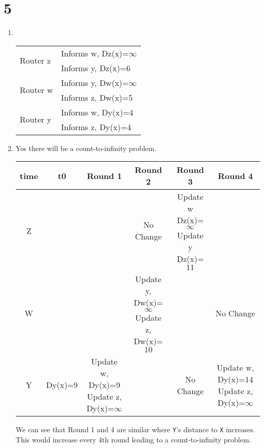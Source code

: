 \section*{5}
\begin{enumerate}[label=\alph*.]
    \item ~
    \begin{table}[h]
        \centering
        \begin{tabular}{|l|l|}
            \hline
                \multirow{2}{*}{Router z} & Informs w, Dz(x)=$\infty$   \\ \cline{2-2} 
                                          & Informs y, Dz(x)=6          \\ \hline
                \multirow{2}{*}{Router w} & Informs y, Dw(x)=$\infty$   \\ \cline{2-2} 
                                          & Informs z, Dw(x)=5          \\ \hline
                \multirow{2}{*}{Router y} & Informs w, Dy(x)=4          \\ \cline{2-2} 
                                          & Informs z, Dy(x)=4          \\ \hline
        \end{tabular}
    \end{table}

    \item Yes there will be a count-to-infinity problem.
    
     \begin{table}[h]
        \hskip-2.0cm
        \begin{tabular}{|c|c|c|c|c|c|}
        \hline
        \textbf{time} & \textbf{t0} & \textbf{Round 1} & \textbf{Round 2} & \textbf{Round 3} & \textbf{Round 4} \\
        \hline
        Z & & & No Change & \makecell{Update w Dz(x)=$\infty$\\Update y Dz(x)=$11$} & \\
        \hline
        W & & & \makecell{Update y, Dw(x)=$\infty$\\Update z, Dw(x)=$10$} & & No Change\\
        \hline
        Y & Dy(x)=9 & \makecell{Update w, Dy(x)=9\\Update z, Dy(x)=$\infty$} & & No Change & \makecell{Update w, Dy(x)=14\\Update z, Dy(x)=$\infty$}\\
        \hline
        \end{tabular}
    \end{table}
    
    We can see that Round 1 and 4 are similar where \texttt{Y}'s distance to \texttt{X} increases. This would increase every 4th round leading to a count-to-infinity problem.
    
\end{enumerate}